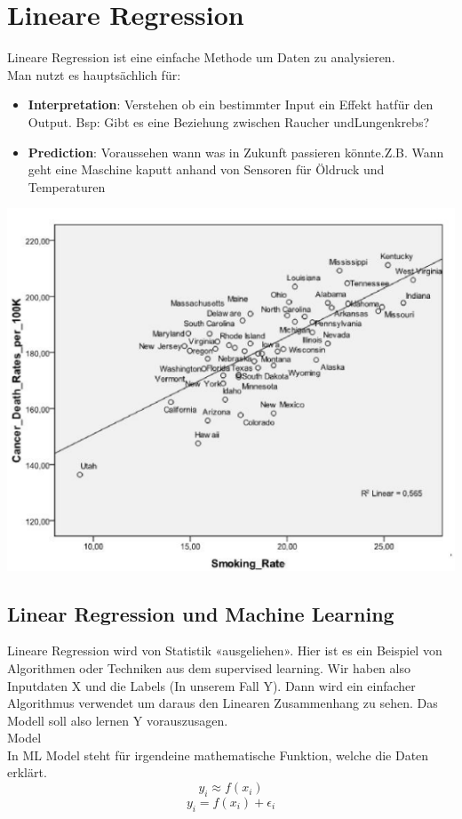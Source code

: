 \section{Lineare Regression}
Lineare Regression ist eine einfache Methode um Daten zu analysieren.\\
Man nutzt es hauptsächlich für:
\begin{itemize}
\item \textbf{Interpretation}: Verstehen ob ein bestimmter Input ein Effekt hatfür den Output. Bsp: Gibt es eine Beziehung zwischen Raucher undLungenkrebs?
\item \textbf{Prediction}: Voraussehen wann was in Zukunft passieren könnte.Z.B. Wann geht eine Maschine kaputt anhand von Sensoren für Öldruck und Temperaturen
\end{itemize}
\includegraphics[width=\linewidth]{img/linear_regression.png}
\subsection{Linear Regression und Machine Learning}
Lineare Regression wird von Statistik «ausgeliehen». Hier ist es ein Beispiel von Algorithmen oder Techniken aus dem supervised learning. Wir haben also Inputdaten X und die Labels (In unserem Fall Y). Dann wird ein einfacher Algorithmus verwendet um daraus den Linearen Zusammenhang zu sehen. Das Modell soll also lernen Y vorauszusagen.\\
\textcolor{myblue}{Model}\\
In ML Model steht für irgendeine mathematische Funktion, welche die Daten erklärt.
$$y_i \approx f(x_i)$$
$$y_i = f(x_i) + \epsilon_i$$


